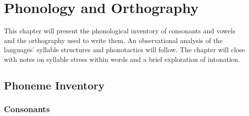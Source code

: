 \chapter{Phonology and Orthography}
\label{cha:tvk-phonology}

This chapter will present the phonological inventory of consonants and vowels and the orthography used to write them. An observational analysis of the \langtvk{} languages' syllable structures and phonotactics will follow. The chapter will close with notes on syllable stress within words and a brief exploration of intonation.

\section{Phoneme Inventory}
\label{sec:tvk-phone-inventory}

\subsection{Consonants}
\label{subsec:tvk-consonants}

